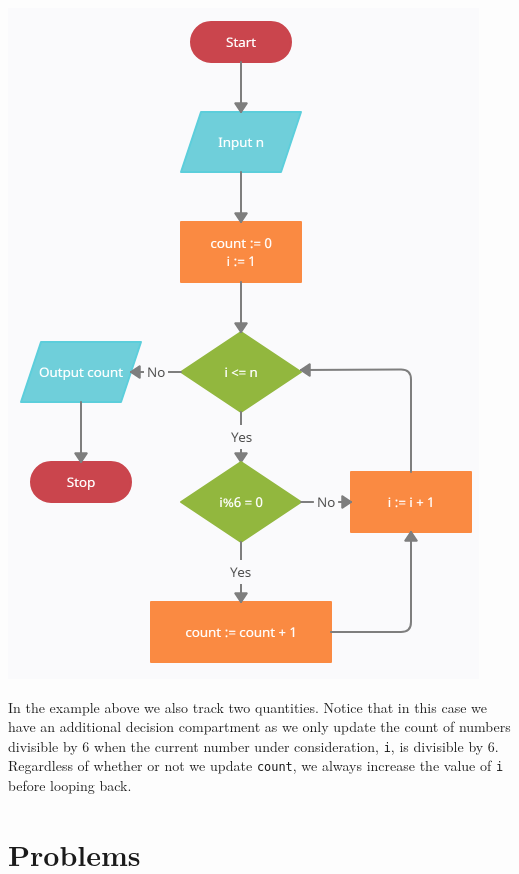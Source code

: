 \documentclass{ximera}
\begin{document}
\begin{center}
	\includegraphics{divby6count.png}
\end{center}

In the example above we also track two quantities. Notice that in this case we have an additional decision compartment as we only update the count of numbers divisible by 6 when the current number under consideration, \verb|i|, is divisible by 6. Regardless of whether or not we update \verb|count|, we always increase the value of \verb|i| before looping back.

\section{Problems}
\end{document}
